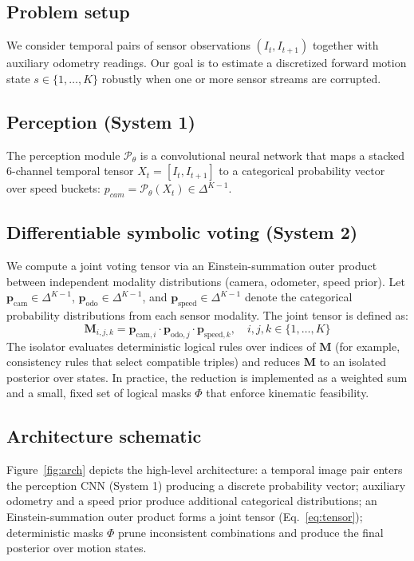 \subsection{Problem setup}
We consider temporal pairs of sensor observations $(I_t, I_{t+1})$ together with auxiliary odometry readings. Our goal is to estimate a discretized forward motion state $s\in\{1,\dots,K\}$ robustly when one or more sensor streams are corrupted.

\subsection{Perception (System 1)}
The perception module $\mathcal{P}_\theta$ is a convolutional neural network that maps a stacked 6-channel temporal tensor $X_t = [I_t, I_{t+1}]$ to a categorical probability vector over speed buckets: $p_{cam}=\mathcal{P}_\theta(X_t)\in\Delta^{K-1}$.

\subsection{Differentiable symbolic voting (System 2)}
We compute a joint voting tensor via an Einstein-summation outer product between independent modality distributions (camera, odometer, speed prior). Let $\mathbf{p}_{\text{cam}} \in \Delta^{K-1}$, $\mathbf{p}_{\text{odo}} \in \Delta^{K-1}$, and $\mathbf{p}_{\text{speed}} \in \Delta^{K-1}$ denote the categorical probability distributions from each sensor modality. The joint tensor is defined as:
\begin{equation}
\mathbf{M}_{i,j,k} = \mathbf{p}_{\text{cam},i} \cdot \mathbf{p}_{\text{odo},j} \cdot \mathbf{p}_{\text{speed},k}, \quad i,j,k \in \{1, \ldots, K\}
\label{eq:tensor}
\end{equation}
The isolator evaluates deterministic logical rules over indices of $\mathbf{M}$ (for example, consistency rules that select compatible triples) and reduces $\mathbf{M}$ to an isolated posterior over states. In practice, the reduction is implemented as a weighted sum and a small, fixed set of logical masks $\Phi$ that enforce kinematic feasibility.

\subsection{Architecture schematic}
Figure~\ref{fig:arch} depicts the high-level architecture: a temporal image pair enters the perception CNN (System 1) producing a discrete probability vector; auxiliary odometry and a speed prior produce additional categorical distributions; an Einstein-summation outer product forms a joint tensor (Eq.~\ref{eq:tensor}); deterministic masks $\Phi$ prune inconsistent combinations and produce the final posterior over motion states.

